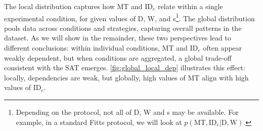 \documentclass[acmlarge, manuscript,review]{acmart}
\newcommand{\mt}{\ensuremath{{\text{MT}}}\xspace}
\newcommand{\ide}{\ensuremath{{\text{ID}_e}}\xspace}
\newcommand{\D}{\ensuremath{{\text{D}}}\xspace}
\newcommand{\W}{\ensuremath{{\text{W}}}\xspace}
\begin{document}
The local distribution captures how MT and \ide relate within a single experimental condition, for given values of D, W, and s\footnote{Depending on the protocol, not all of D, W and s may be available. For example, in a standard Fitts protocol, we will look at $p(\mt, \ide | \D, \W)$.}.
The global distribution pools data across conditions and strategies, capturing overall patterns in the dataset.
As we will show in the remainder, these two perspectives lead to different conclusions: within individual conditions, MT and \ide often appear weakly dependent, but when conditions are aggregated, a global trade-off consistent with the SAT emerges.
\autoref{fig:global_local_dep} illustrates this effect: locally, dependencies are weak, but globally, high values of MT align with high values of \ide.

\begin{figure}[htbp]
  \centering
\end{figure}
\end{document}
